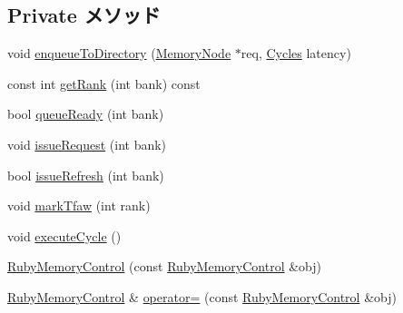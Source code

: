 \subsection*{Private メソッド}
\begin{DoxyCompactItemize}
\item 
void \hyperlink{classRubyMemoryControl_a5ad0e6ec636d4094ee1b89c121d37dd9}{enqueueToDirectory} (\hyperlink{classMemoryNode}{MemoryNode} $\ast$req, \hyperlink{classCycles}{Cycles} latency)
\item 
const int \hyperlink{classRubyMemoryControl_a39abe91d99c7b551495766a397e212af}{getRank} (int bank) const 
\item 
bool \hyperlink{classRubyMemoryControl_a839c1841354bab0a9007a04ba303ae2c}{queueReady} (int bank)
\item 
void \hyperlink{classRubyMemoryControl_a9dbeedd7a40a225736f517e46ef9915e}{issueRequest} (int bank)
\item 
bool \hyperlink{classRubyMemoryControl_a3907d2ad8de317b5d9488e567b8c29de}{issueRefresh} (int bank)
\item 
void \hyperlink{classRubyMemoryControl_a8fb7d0c7e12bbd524e3bcd193e66426c}{markTfaw} (int rank)
\item 
void \hyperlink{classRubyMemoryControl_ac776b02b70a3c6795e0823d77bf74c73}{executeCycle} ()
\item 
\hyperlink{classRubyMemoryControl_a91e8e84c0a773621f4e6f5adafb726fb}{RubyMemoryControl} (const \hyperlink{classRubyMemoryControl_1_1RubyMemoryControl}{RubyMemoryControl} \&obj)
\item 
\hyperlink{classRubyMemoryControl_1_1RubyMemoryControl}{RubyMemoryControl} \& \hyperlink{classRubyMemoryControl_a625dea61d2ea0f477b1310e9307a33d6}{operator=} (const \hyperlink{classRubyMemoryControl_1_1RubyMemoryControl}{RubyMemoryControl} \&obj)
\end{DoxyCompactItemize}

